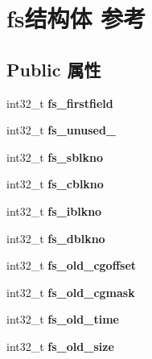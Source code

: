 \hypertarget{structfs}{}\section{fs结构体 参考}
\label{structfs}
\subsection*{Public 属性}
\begin{DoxyCompactItemize}
\item 
\mbox{\label{structfs_a845f442a845714c10fff6d8b12c9eb9e}} 
int32\+\_\+t {\bfseries fs\+\_\+firstfield}
\item 
\mbox{\label{structfs_a7246de3f8042955f49127b1e656838f5}} 
int32\+\_\+t {\bfseries fs\+\_\+unused\+\_}
\item 
\mbox{\label{structfs_ab96f2622ae5d8b12c0ca31a210b3c58e}} 
int32\+\_\+t {\bfseries fs\+\_\+sblkno}
\item 
\mbox{\label{structfs_adedb82f28a6436a506aa3c47bdf49aa0}} 
int32\+\_\+t {\bfseries fs\+\_\+cblkno}
\item 
\mbox{\label{structfs_a680d9067242a7b551779146d839997f4}} 
int32\+\_\+t {\bfseries fs\+\_\+iblkno}
\item 
\mbox{\label{structfs_afc80e8002a127f6e31ab675bc79d7466}} 
int32\+\_\+t {\bfseries fs\+\_\+dblkno}
\item 
\mbox{\label{structfs_a0e65a1457e48bf92c3ff9ed5de2d2f97}} 
int32\+\_\+t {\bfseries fs\+\_\+old\+\_\+cgoffset}
\item 
\mbox{\label{structfs_a3372db524b01604405d0736d4c76ed88}} 
int32\+\_\+t {\bfseries fs\+\_\+old\+\_\+cgmask}
\item 
\mbox{\label{structfs_a948e2a387ab0a3cfd674e93db8e9faf0}} 
int32\+\_\+t {\bfseries fs\+\_\+old\+\_\+time}
\item 
\mbox{\label{structfs_ad24dc27973a0594319921fe1aa0394d4}} 
int32\+\_\+t {\bfseries fs\+\_\+old\+\_\+size}
\item 

\end{DoxyCompactItemize}
